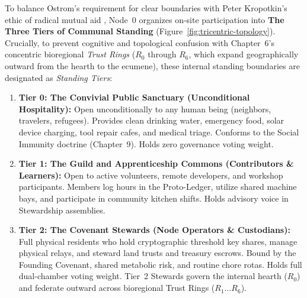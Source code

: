 To balance Ostrom's requirement for clear boundaries with Peter Kropotkin's ethic of radical mutual aid \parencite{kropotkin1902}, Node~0 organizes on-site participation into \textbf{The Three Tiers of Communal Standing} (Figure~\ref{fig:tricentric-topology}). Crucially, to prevent cognitive and topological confusion with Chapter~6's concentric bioregional \textit{Trust Rings} ($R_0$ through $R_6$, which expand geographically outward from the hearth to the ecumene), these internal standing boundaries are designated as \textit{Standing Tiers}:
\begin{enumerate}
    \item \textbf{Tier 0: The Convivial Public Sanctuary (Unconditional Hospitality):} Open unconditionally to any human being (neighbors, travelers, refugees). Provides clean drinking water, emergency food, solar device charging, tool repair cafes, and medical triage. Conforms to the Social Immunity doctrine (Chapter~9). Holds zero governance voting weight.
    \item \textbf{Tier 1: The Guild and Apprenticeship Commons (Contributors \& Learners):} Open to active volunteers, remote developers, and workshop participants. Members log hours in the Proto-Ledger, utilize shared machine bays, and participate in community kitchen shifts. Holds advisory voice in Stewardship assemblies.
    \item \textbf{Tier 2: The Covenant Stewards (Node Operators \& Custodians):} Full physical residents who hold cryptographic threshold key shares, manage physical relays, and steward land trusts and treasury escrows. Bound by the Founding Covenant, shared metabolic risk, and routine chore rotas. Holds full dual-chamber voting weight. Tier~2 Stewards govern the internal hearth ($R_0$) and federate outward across bioregional Trust Rings ($R_1 \dots R_6$).
\end{enumerate}

